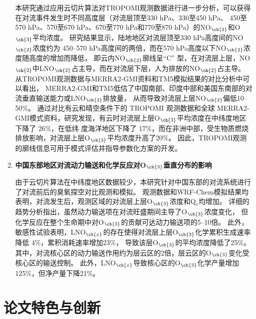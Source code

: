 \begin{enumerate}[label=（\arabic*）, labelindent=\parindent, nosep, leftmargin=0pt, widest=0, itemindent=*, topsep=0pt, partopsep=0pt, parsep=0pt]
\hspace{4ex} 本研究通过应用云切片算法对TROPOMI观测数据进行进一步分析，可以获得在对流事件发生时不同高度层（对流层顶至330 hPa、330至450 hPa、
450至570 hPa、570至670 hPa、670至770 hPa和770至870 hPa）的NO$_{\ch{2}}$和O$_{\ch{3}}$平均浓度。
研究结果显示，陆地地区对流层顶至330 hPa高度间的NO$_{\ch{2}}$浓度约为 450--570 hPa高度间的两倍，而在570 hPa高度以下NO$_{\ch{2}}$浓度随高度的增加而降低，
即云内NO$_{\ch{2}}$廓线呈“C” 型，在对流层上层，NO$_{\ch{2}}$中LNO$_{\ch{2}}$占主导，而在对流层下层，人为排放的NO$_{\ch{2}}$占主导。
从TROPOMI观测数据与MERRA2-GMI资料和TM5模拟结果的对比分析中可以看出，
MERRA2-GMI和TM5低估了中国南部、印度中部和美国东南部的对流垂直输送能力或LNO$_{\ch{2}}$排放量，
从而导致对流层上层NO$_{\ch{2}}$偏低10--50\%。
通过对比有云和晴空条件下的 TROPOMI 观测数据和全球
MERRA2-GMI模式资料，研究发现，有云时对流层上层O$_{\ch{3}}$平均浓度在中纬度地区下降了 26\%，在低纬
度海洋地区下降了 17\%，而在非洲中部，受生物质燃烧排放影响，对流层上层O$_{\ch{3}}$平均浓度升高了20\%。
因此，TROPOMI观测的廓线信息可用于模式评估并指导参数化方案的开发。

\item \textbf{中国东部地区对流动力输送和化学反应对O$_{\ch{3}}$垂直分布的影响}

\hspace{4ex} 由于云切片算法在中纬度地区数据较少，本研究针对中国东部的对流系统进行了对流前后的臭氧探空对比观测和模拟。
观测数据和WRF-Chem模拟结果均表明，对流发生后，观测区域的对流层上层O$_{\ch{3}}$浓度和Q$_v$均增加。
详细的趋势分析指出，虽然动力输送项在对流旺盛期间主导了O$_{\ch{3}}$浓度变化，
但化学反应在整个生命期中对O$_{\ch{3}}$的贡献可达动力输送项的5--10倍。
此外，敏感性试验表明，LNO$_{\ch{x}}$的存在使得对流层上层O$_{\ch{3}}$化学累积生成速率降低 4\%，累积消耗速率增加23\%，
导致该层O$_{\ch{3}}$的平均浓度降低了25\%。
其中，对流核心区的动力输送作用约为层云区的2倍，层云区的O$_{\ch{3}}$变化受核心区的输送控制。
此外，LNO$_{\ch{x}}$导致核心区的O$_{\ch{3}}$化学产量增加125\%，但净产量下降21\%。


\end{enumerate}

\section{论文特色与创新}

